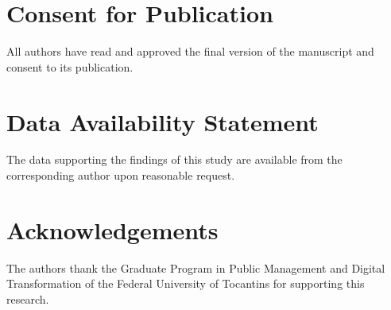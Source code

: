 \documentclass[12pt,a4paper]{article}
\begin{document}
\section*{Consent for Publication}

All authors have read and approved the final version of the manuscript and consent to its publication.

\section*{Data Availability Statement}

The data supporting the findings of this study are available from the corresponding author upon reasonable request.

\section*{Acknowledgements}

The authors thank the Graduate Program in Public Management and Digital Transformation of the Federal University of Tocantins for supporting this research.
\end{document}
